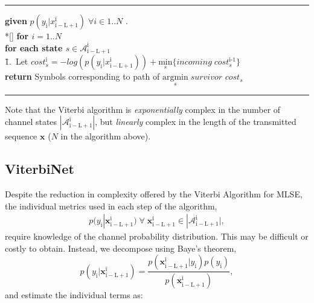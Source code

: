 \documentclass[12pt,a4paper]{article}
\begin{document}
    \noindent\rule[10pt]{\textwidth}{0.4pt}
    {\footnotesize
    \begin{tabbing}
        {\bf given} $p(y_{\mathrm{i}}|x_{\mathrm{i-L+1}}^{\mathrm{i}}) \; \forall i \in {1..N}$ . \\*[\smallskipamount]
        {\bf for $i = 1..N $} \\
         \qquad \= {\bf for each state $s \in \mathcal{A}_{\mathrm{i-L+1}}^{\mathrm{i}}$}\\
        \qquad \qquad \= 1.\ Let $\textit{cost}_{s}^{\text{i}} = -log(p(y_{\mathrm{i}}|x_{\mathrm{i-L+1}}^{\mathrm{i}})) + \underset{s}{\text{min}} \{incoming\;\textit{cost}_{s}^{\text{i-1}}\}$ \\
        {\bf return} Symbols corresponding to path of $\underset{s}{\text{argmin}} \; \textit{survivor cost}_{s} $
    \end{tabbing}}
    \noindent\rule[10pt]{\textwidth}{0.4pt}


Note that the Viterbi algorithm is \emph{exponentially} complex in the number of channel states $|\mathcal{A}_{\mathrm{i-L+1}}^{\mathrm{i}}|$, but \emph{linearly} complex in the length of the transmitted sequence $\mathbf{x}$ ($N$ in the algorithm above). 


\subsection{ViterbiNet}
Despite the reduction in complexity offered by the Viterbi Algorithm for MLSE, the individual metrics used in each step of the algorithm,
\begin{gather*}
p(y_{\mathrm{i}}|\mathbf{x}_{\mathrm{i-L+1}}^{\mathrm{i}})\;\forall\; \mathbf{x}_{\mathrm{i-L+1}}^{\mathrm{i}} \in
|\mathcal{A}_{\mathrm{i-L+1}}^{\mathrm{i}}|,
\end{gather*} require knowledge of the channel probability distribution. This may be difficult or costly to obtain. Instead, we decompose using Baye's theorem,
\begin{equation}
p(y_{\mathrm{i}}|\mathbf{x}_{\mathrm{i-L+1}}^{\mathrm{i}}) = 
\frac
{p(\mathbf{x}_{\mathrm{i-L+1}}^{\mathrm{i}}|y_{\mathrm{i}})p(y_{\mathrm{i}})}
{p(\mathbf{x}_{\mathrm{i-L+1}}^{\mathrm{i}})},
\end{equation}
and estimate the individual terms as:
\end{document}
